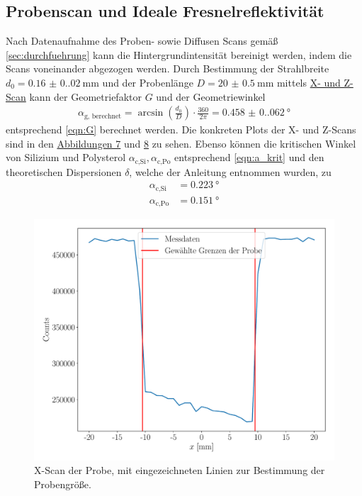 \documentclass[12pt]{article}
\begin{document}
\subsection{Probenscan und Ideale Fresnelreflektivität}
Nach Datenaufnahme des Proben- sowie Diffusen Scans gemäß \autoref{sec:durchfuehrung} kann die Hintergrundintensität bereinigt werden, indem die Scans voneinander abgezogen werden.
Durch Bestimmung der Strahlbreite $d_0=\SI{0.16(0.02)}{\milli\meter}$ und der Probenlänge $D=\SI{20(0.5)}{\milli\meter}$ mittels \hyperref[sec:durchfuehrung]{X- und Z-Scan} kann der Geometriefaktor $G$
und der Geometriewinkel
\begin{align*}
  \alpha_\text{g, berechnet}=\arcsin\left(\frac{d_0}{D}\right) \cdot \frac{360}{2 \pi}=\SI{0.458(0.062)}{\degree}
\end{align*}
entsprechend \autoref{eqn:G} berechnet werden. Die konkreten Plots der X- und Z-Scans sind in den \hyperref[fig:x]{Abbildungen 7} und \hyperref[fig:x]{8} zu sehen.
Ebenso können die kritischen Winkel von Silizium und Polysterol $\alpha_\text{c,Si}, \alpha_\text{c,Po}$ entsprechend \autoref{eqn:a_krit} und den theoretischen Dispersionen $\delta$, welche der Anleitung entnommen wurden, zu
\begin{align*}
  \alpha_\text{c,Si}&=\SI{0.223}{\degree}\\
  \alpha_\text{c,Po}&=\SI{0.151}{\degree}
\end{align*}
\begin{figure}[H]
  \centering
  \includegraphics[scale=0.5]{Ressourcen/xscan.pdf}
  \caption{X-Scan der Probe, mit eingezeichneten Linien zur Bestimmung der Probengröße.}\label{fig:x}
\end{figure}
\end{document}
